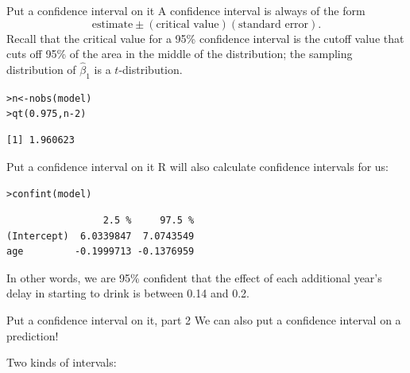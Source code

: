 \documentclass{beamer}\usepackage[]{graphicx}\usepackage[]{color}
\makeatletter
\newcommand{\hlnum}[1]{\textcolor[rgb]{0.824,0.412,0.118}{#1}}%
\newcommand{\hlopt}[1]{\textcolor[rgb]{1,0.894,0.769}{#1}}%
\newcommand{\hlstd}[1]{\textcolor[rgb]{1,0.894,0.769}{#1}}%
\newcommand{\hlkwb}[1]{\textcolor[rgb]{0.804,0.776,0.451}{#1}}%
\newcommand{\hlkwd}[1]{\textcolor[rgb]{1,0.78,0.769}{#1}}%
\newenvironment{kframe}{%
 \def\at@end@of@kframe{}%
 \ifinner\ifhmode%
  \def\at@end@of@kframe{\end{minipage}}%
  \begin{minipage}{\columnwidth}%
 \fi\fi%
 \def\FrameCommand##1{\hskip\@totalleftmargin \hskip-\fboxsep
 \colorbox{shadecolor}{##1}\hskip-\fboxsep
     \hskip-\linewidth \hskip-\@totalleftmargin \hskip\columnwidth}%
 \MakeFramed {\advance\hsize-\width
   \@totalleftmargin\z@ \linewidth\hsize
   \@setminipage}}%
 {\par\unskip\endMakeFramed%
 \at@end@of@kframe}
\newenvironment{knitrout}{}{} %
\makeatother
\begin{document}
\begin{darkframes}
    \begin{frame}[fragile]{Put a confidence interval on it}
      A confidence interval is always of the form \[ \text{estimate} \pm (\text{critical value})(\text{standard error}). \]
      \pause
      Recall that the critical value for a 95\% confidence interval is the cutoff value that cuts off 95\% of the area in the middle of the distribution; the sampling distribution of $\hat\beta_1$ is a $t$-distribution.


\begin{knitrout}
\begin{kframe}
\begin{alltt}
\hlstd{> }\hlstd{n} \hlkwb{<-} \hlkwd{nobs}\hlstd{(model)}
\hlstd{> }\hlkwd{qt}\hlstd{(}\hlnum{0.975}\hlstd{, n}\hlopt{-}\hlnum{2}\hlstd{)}
\end{alltt}
\begin{verbatim}
[1] 1.960623
\end{verbatim}
\end{kframe}
\end{knitrout}
    \end{frame}

    \begin{frame}[fragile]{Put a confidence interval on it}
      R will also calculate confidence intervals for us:
\begin{knitrout}
\begin{kframe}
\begin{alltt}
\hlstd{> }\hlkwd{confint}\hlstd{(model)}
\end{alltt}
\begin{verbatim}
                 2.5 %     97.5 %
(Intercept)  6.0339847  7.0743549
age         -0.1999713 -0.1376959
\end{verbatim}
\end{kframe}
\end{knitrout}

      \pause
      In other words, we are 95\% confident that the effect of each additional year's delay in starting to drink is between 0.14 and 0.2.
    \end{frame}

    \begin{frame}{Put a confidence interval on it, part 2}
      We can also put a confidence interval on a prediction!

      Two kinds of intervals:
      \bigskip


\end{frame}
\end{darkframes}
\end{document}
